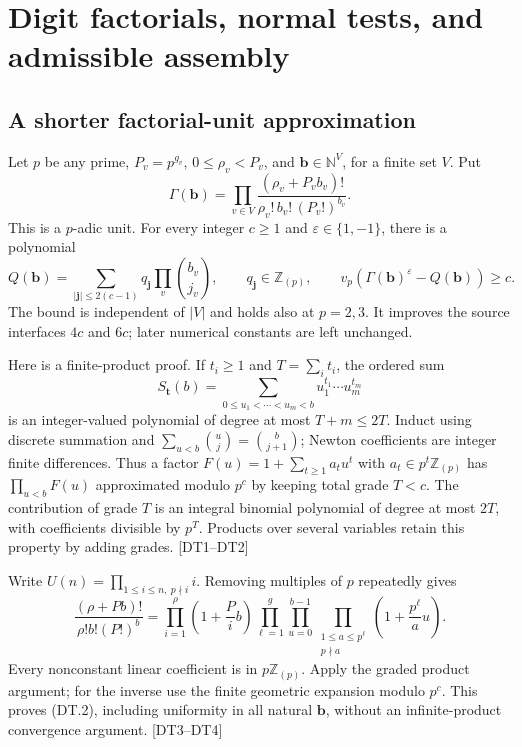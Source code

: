 \section{Digit factorials, normal tests, and admissible assembly}
\label{sec:digit-tests}


\subsection{A shorter factorial-unit approximation}

Let $p$ be any prime, $P_v=p^{g_v}$, $0\le\rho_v<P_v$, and $\mathbf b\in\mathbb N^V$, for a finite set $V$. Put
\[
 \Gamma(\mathbf b)=\prod_{v\in V}
 \frac{(\rho_v+P_vb_v)!}{\rho_v!\,b_v!\,(P_v!)^{b_v}}.
 \tag{DT.1}
\]
This is a $p$-adic unit. For every integer $c\ge1$ and $\varepsilon\in\{1,-1\}$, there is a polynomial
\[
 Q(\mathbf b)=\sum_{|\mathbf j|\le2(c-1)}q_{\mathbf j}
       \prod_v\binom{b_v}{j_v},\qquad q_{\mathbf j}\in\mathbb Z_{(p)},
 \qquad v_p(\Gamma(\mathbf b)^\varepsilon-Q(\mathbf b))\ge c.
 \tag{DT.2}
\]
The bound is independent of $|V|$ and holds also at $p=2,3$. It improves the source interfaces $4c$ and $6c$; later numerical constants are left unchanged.

Here is a finite-product proof. If $t_i\ge1$ and $T=\sum_i t_i$, the ordered sum
\[
 S_{\mathbf t}(b)=\sum_{0\le u_1<\cdots<u_m<b}u_1^{t_1}\cdots u_m^{t_m}
\]
is an integer-valued polynomial of degree at most $T+m\le2T$. Induct using discrete summation and $\sum_{u<b}\binom uj=\binom b{j+1}$; Newton coefficients are integer finite differences. Thus a factor $F(u)=1+\sum_{t\ge1}a_tu^t$ with $a_t\in p^t\mathbb Z_{(p)}$ has
$\prod_{u<b}F(u)$ approximated modulo $p^c$ by keeping total grade $T<c$. The contribution of grade $T$ is an integral binomial polynomial of degree at most $2T$, with coefficients divisible by $p^T$. Products over several variables retain this property by adding grades. \textsf{[DT1--DT2]}

Write $U(n)=\prod_{1\le i\le n,\ p\nmid i}i$. Removing multiples of $p$ repeatedly gives
\[
 \frac{(\rho+Pb)!}{\rho!b!(P!)^b}
 =\prod_{i=1}^{\rho}\left(1+\frac{P}{i}b\right)
  \prod_{\ell=1}^{g}\prod_{u=0}^{b-1}
       \prod_{\substack{1\le a\le p^\ell\\p\nmid a}}
            \left(1+\frac{p^\ell}{a}u\right).
 \tag{DT.3}
\]
Every nonconstant linear coefficient is in $p\mathbb Z_{(p)}$. Apply the graded product argument; for the inverse use the finite geometric expansion modulo $p^c$. This proves (DT.2), including uniformity in all natural $\mathbf b$, without an infinite-product convergence argument. \textsf{[DT3--DT4]}

